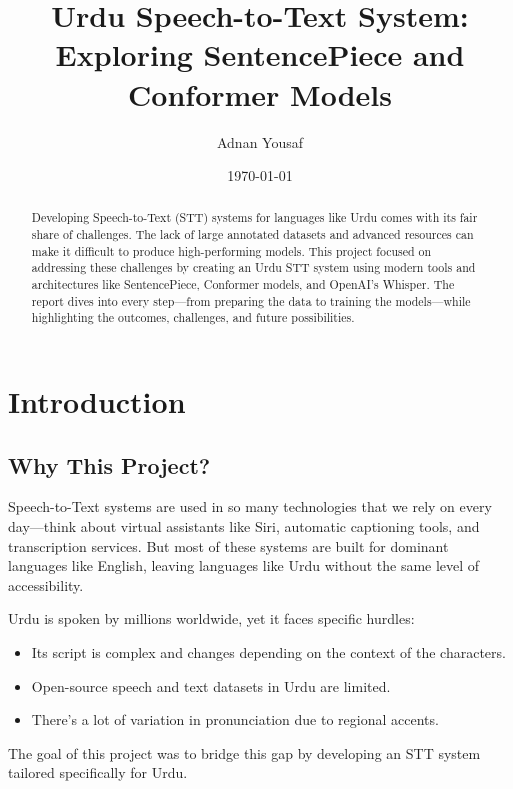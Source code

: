 \documentclass[12pt,a4paper]{report}
\begin{document}
\title{Urdu Speech-to-Text System: Exploring SentencePiece and Conformer Models}
\author{Adnan Yousaf}
\date{\today}
\maketitle

\begin{abstract}
Developing Speech-to-Text (STT) systems for languages like Urdu comes with its fair share of challenges. The lack of large annotated datasets and advanced resources can make it difficult to produce high-performing models. This project focused on addressing these challenges by creating an Urdu STT system using modern tools and architectures like SentencePiece, Conformer models, and OpenAI's Whisper. The report dives into every step—from preparing the data to training the models—while highlighting the outcomes, challenges, and future possibilities. 
\end{abstract}

\tableofcontents

\chapter{Introduction}
\section{Why This Project?}
Speech-to-Text systems are used in so many technologies that we rely on every day—think about virtual assistants like Siri, automatic captioning tools, and transcription services. But most of these systems are built for dominant languages like English, leaving languages like Urdu without the same level of accessibility. 

Urdu is spoken by millions worldwide, yet it faces specific hurdles:
\begin{itemize}
    \item Its script is complex and changes depending on the context of the characters.
    \item Open-source speech and text datasets in Urdu are limited.
    \item There’s a lot of variation in pronunciation due to regional accents.
\end{itemize}

The goal of this project was to bridge this gap by developing an STT system tailored specifically for Urdu.
\end{document}
